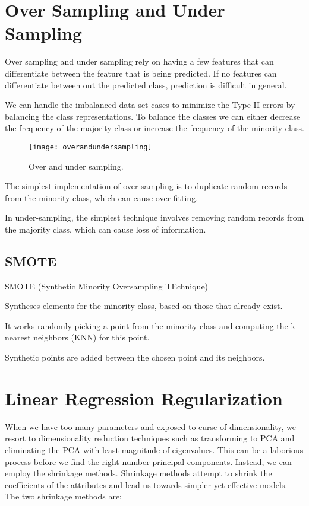 	\section{Over Sampling and Under Sampling}
Over sampling and under sampling rely on having a few features that can differentiate between the feature that is being predicted.  If no features can differentiate between out the predicted class, prediction is difficult in general.

We can handle the imbalanced data set cases to minimize the Type II errors by balancing the class representations.  To balance the classes we can either decrease the frequency of the majority class or increase the frequency of the minority class.
	\begin{figure}[h]
		\centering
		\texttt{[image: overandundersampling]}
		\caption{Over and under sampling.}
		\label{fig:overandundersampling}
	\end{figure}

The simplest implementation of over-sampling is to duplicate random records from the minority class, which can cause over fitting.

In under-sampling, the simplest technique involves removing random records from the majority class, which can cause loss of information.

	\subsection{SMOTE}
SMOTE (Synthetic Minority Oversampling TEchnique)
	\begin{bulletedlist}
		\item Syntheses elements for the minority class, based on those that already exist.
		\item It works randomly picking a point from the minority class and computing the k-nearest neighbors (KNN) for this point.
		\item Synthetic points are added between the chosen point and its neighbors.
	\end{bulletedlist}


	\section{Linear Regression Regularization}

When we have too many parameters and exposed to curse of dimensionality, we resort to dimensionality reduction techniques such as transforming to PCA and eliminating the PCA with least magnitude of eigenvalues. This can be a laborious process before we find the right number principal components. Instead, we can employ the shrinkage methods.  Shrinkage methods attempt to shrink the coefficients of the attributes and lead us towards simpler yet effective models. The two shrinkage methods are:

